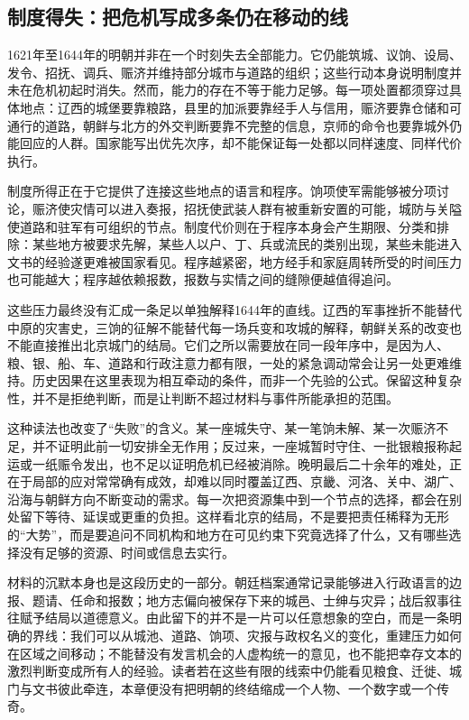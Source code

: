 \subsection{制度得失：把危机写成多条仍在移动的线}

1621年至1644年的明朝并非在一个时刻失去全部能力。它仍能筑城、议饷、设局、发令、招抚、调兵、赈济并维持部分城市与道路的组织；这些行动本身说明制度并未在危机初起时消失。然而，能力的存在不等于能力足够。每一项处置都须穿过具体地点：辽西的城堡要靠粮路，县里的加派要靠经手人与信用，赈济要靠仓储和可通行的道路，朝鲜与北方的外交判断要靠不完整的信息，京师的命令也要靠城外仍能回应的人群。国家能写出优先次序，却不能保证每一处都以同样速度、同样代价执行。

制度所得正在于它提供了连接这些地点的语言和程序。饷项使军需能够被分项讨论，赈济使灾情可以进入奏报，招抚使武装人群有被重新安置的可能，城防与关隘使道路和驻军有可组织的节点。制度代价则在于程序本身会产生期限、分类和排除：某些地方被要求先解，某些人以户、丁、兵或流民的类别出现，某些未能进入文书的经验遂更难被国家看见。程序越紧密，地方经手和家庭周转所受的时间压力也可能越大；程序越依赖报数，报数与实情之间的缝隙便越值得追问。

这些压力最终没有汇成一条足以单独解释1644年的直线。辽西的军事挫折不能替代中原的灾害史，三饷的征解不能替代每一场兵变和攻城的解释，朝鲜关系的改变也不能直接推出北京城门的结局。它们之所以需要放在同一段年序中，是因为人、粮、银、船、车、道路和行政注意力都有限，一处的紧急调动常会让另一处更难维持。历史因果在这里表现为相互牵动的条件，而非一个先验的公式。保留这种复杂性，并不是拒绝判断，而是让判断不超过材料与事件所能承担的范围。

这种读法也改变了“失败”的含义。某一座城失守、某一笔饷未解、某一次赈济不足，并不证明此前一切安排全无作用；反过来，一座城暂时守住、一批银粮报称起运或一纸赈令发出，也不足以证明危机已经被消除。晚明最后二十余年的难处，正在于局部的应对常常确有成效，却难以同时覆盖辽西、京畿、河洛、关中、湖广、沿海与朝鲜方向不断变动的需求。每一次把资源集中到一个节点的选择，都会在别处留下等待、延误或更重的负担。这样看北京的结局，不是要把责任稀释为无形的“大势”，而是要追问不同机构和地方在可见约束下究竟选择了什么，又有哪些选择没有足够的资源、时间或信息去实行。

材料的沉默本身也是这段历史的一部分。朝廷档案通常记录能够进入行政语言的边报、题请、任命和报数；地方志偏向被保存下来的城邑、士绅与灾异；战后叙事往往赋予结局以道德意义。由此留下的并不是一片可以任意想象的空白，而是一条明确的界线：我们可以从城池、道路、饷项、灾报与政权名义的变化，重建压力如何在区域之间移动；不能替没有发言机会的人虚构统一的意见，也不能把幸存文本的激烈判断变成所有人的经验。读者若在这些有限的线索中仍能看见粮食、迁徙、城门与文书彼此牵连，本章便没有把明朝的终结缩成一个人物、一个数字或一个传奇。

